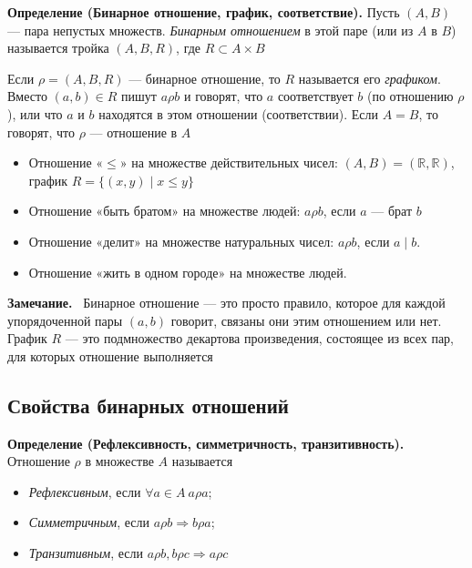 \documentclass[a4paper,12pt]{article}
\newcommand{\myremark}{\textbf{Замечание.}\ }
\theoremstyle{definition}
\theoremstyle{plain}
\theoremstyle{remark}
\begin{document}
	\noindent \textbf{Определение (Бинарное отношение, график, соответствие).}
	Пусть $(A, B)$ — пара непустых множеств. \textit{Бинарным отношением} в этой паре (или из $A$ в $B$) называется тройка $(A, B, R)$, где $R \subset A \times B$
	
	\medskip
	Если $\rho = (A, B, R)$ — бинарное отношение, то $R$ называется его \textit{графиком}. Вместо $(a, b) \in R$ пишут $a \rho b$ и говорят, что $a$ соответствует $b$ (по отношению $\rho$), или что $a$ и $b$ находятся в этом отношении (соответствии). Если $A = B$, то говорят, что $\rho$ — отношение в $A$
	
	\begin{tcolorbox}[colback=gray!5, colframe=gray!50, title=Примеры бинарных отношений]
		\begin{itemize}
			\item Отношение «$\leq$» на множестве действительных чисел: $(A, B) = (\mathbb{R}, \mathbb{R})$, график $R = \{(x, y) \mid x \leq y\}$
			\item Отношение «быть братом» на множестве людей: $a \rho b$, если $a$ — брат $b$
			\item Отношение «делит» на множестве натуральных чисел: $a \rho b$, если $a \mid b$.
			\item Отношение «жить в одном городе» на множестве людей.
		\end{itemize}
	\end{tcolorbox}
	
	\myremark
	Бинарное отношение — это просто правило, которое для каждой упорядоченной пары $(a, b)$ говорит, связаны они этим отношением или нет. График $R$ — это подмножество декартова произведения, состоящее из всех пар, для которых отношение выполняется
	
	\subsection{Свойства бинарных отношений}
	
	\noindent \textbf{Определение (Рефлексивность, симметричность, транзитивность).}
	Отношение $\rho$ в множестве $A$ называется
	\begin{itemize}
		\item \textit{Рефлексивным}, если $\forall a \in A \ a \rho a$;
		\item \textit{Симметричным}, если $a \rho b \Rightarrow b \rho a$;
		\item \textit{Транзитивным}, если $a \rho b, b \rho c \Rightarrow a \rho c$
	\end{itemize}
	
\end{document}

